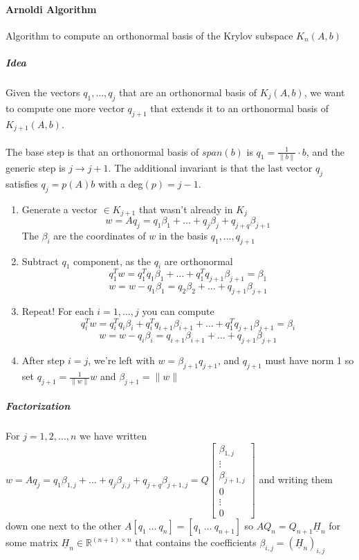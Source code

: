 \documentclass[10pt]{report}
\begin{document}
\paragraph{Arnoldi Algorithm} Algorithm to compute an orthonormal basis of the Krylov subspace $K_n(A,b)$
\subparagraph{Idea} Given the vectors $q_1,\ldots,q_j$ that are an orthonormal basis of $K_j(A,b)$, we want to compute one more vector $q_{j+1}$ that extends it to an orthonormal basis of $K_{j+1}(A,b)$.\\\\
The base step is that an orthonormal basis of $span(b)$ is $q_1=\frac{1}{\|b\|}\cdot b$, and the generic step is $j\rightarrow j+1$. The additional invariant is that the last vector $q_j$ satisfies $q_j=p(A)b$ with a deg$(p)=j-1$.
\begin{enumerate}
	\item Generate a vector $\in K_{j+1}$ that wasn't already in $K_j$
	$$w = Aq_j = q_1\beta_1+\ldots + q_j\beta_j + q_{j+q}\beta_{j+1}$$
	The $\beta_i$ are the coordinates of $w$ in the basis $q_1,\ldots,q_{j+1}$
	\item Subtract $q_1$ component, as the $q_i$ are orthonormal
	$$q_1^Tw = q_1^Tq_1\beta_1+\ldots+q_1^Tq_{j+1}\beta_{j+1} = \beta_1$$
	$$w = w - q_1\beta_1 = q_2\beta_2 + \ldots + q_{j+1}\beta_{j+1}$$
	\item Repeat! For each $i=1,\ldots,j$ you can compute
	$$q_i^Tw = q_i^Tq_i\beta_i + q_i^Tq_{i+1}\beta_{i+1}+\ldots+q_1^Tq_{j+1}\beta_{j+1} = \beta_i$$
	$$w = w - q_i\beta_i = q_{i+1}\beta_{i+1} + \ldots + q_{j+1}\beta_{j+1}$$
	\item After step $i=j$, we're left with $w = \beta_{j+1}q_{j+1}$, and $q_{j+1}$ must have norm 1 so set $q_{j+1}=\frac{1}{\|w\|}w$ and $\beta_{j+1}= \|w\|$
\end{enumerate}
\subparagraph{Factorization} For $j=1,2,\ldots,n$ we have written $w = Aq_j = q_1\beta_{1,j}+\ldots + q_j\beta_{j,j} + q_{j+q}\beta_{j+1,j} = Q\left[\begin{array}{c}
\beta_{1,j}\\\vdots\\\beta_{j+1,j}\\0\\\vdots\\0
\end{array}\right]$ and writing them down one next to the other $A[q_1\:\ldots\:q_n] = [q_1\:\ldots\:q_{n+1}]$ so $AQ_n = Q_{n+1}\underline{H}_n$ for some matrix $\underline{H}_n\in \mathbb{R}^{(n+1)\times n}$ that contains the coefficients $\beta_{i,j} = (\underline{H}_n)_{i,j}$
\end{document}

